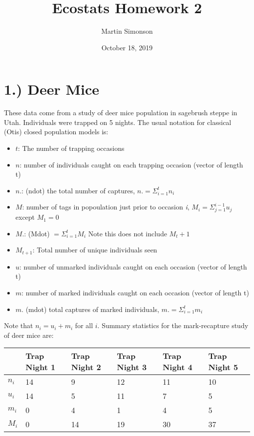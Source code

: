 \documentclass[]{article}
\title{Ecostats Homework 2}
\author{Martin Simonson}
\date{October 18, 2019}
\providecommand{\tightlist}{%
  \setlength{\itemsep}{0pt}\setlength{\parskip}{0pt}}
\begin{document}
\maketitle

\section{1.) Deer Mice}\label{deer-mice}

These data come from a study of deer mice population in sagebrush steppe
in Utah. Individuals were trapped on 5 nights. The usual notation for
classical (Otis) closed population models is:

\begin{itemize}
\tightlist
\item
  \(t\): The number of trapping occasions
\item
  \(n\): number of individuals caught on each trapping occasion (vector
  of length t)
\item
  \(n.\): (ndot) the total number of captures,
  \(n. = \Sigma_{i=1}^t n_i\)
\item
  \(M\): number of tags in popoulation just prior to occasion \emph{i},
  \(M_i = \Sigma_{j=1}^{i-1}u_j\) except \(M_1 = 0\)
\item
  \(M.\): (Mdot) \(=\Sigma_{i=1}^t M_i\) Note this does not include
  \(M_t+1\)
\item
  \(M_{t+1}\): Total number of unique individuals seen
\item
  \(u\): number of unmarked individuals caught on each occasion (vector
  of length t)
\item
  \(m\): number of marked individuals caught on each occasion (vector of
  length t)
\item
  \(m.\) (mdot) total captures of marked individuals,
  \(m. = \Sigma_{i=1}^t m_i\)
\end{itemize}

Note that \(n_i = u_i+m_i\) for all \(i\). Summary statistics for the
mark-recapture study of deer mice are:

\begin{longtable}[]{@{}llllll@{}}
\toprule
& Trap Night 1 & Trap Night 2 & Trap Night 3 & Trap Night 4 & Trap Night
5\tabularnewline
\midrule
\endhead
\(n_i\) & 14 & 9 & 12 & 11 & 10\tabularnewline
\(u_i\) & 14 & 5 & 11 & 7 & 5\tabularnewline
\(m_i\) & 0 & 4 & 1 & 4 & 5\tabularnewline
\(M_i\) & 0 & 14 & 19 & 30 & 37\tabularnewline
\bottomrule
\end{longtable}
\end{document}
